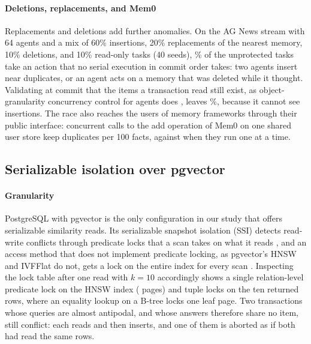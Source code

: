 \documentclass[sigconf, nonacm, review]{acmart}
\begin{document}
\paragraph{Deletions, replacements, and Mem0}
Replacements and deletions add further anomalies. On the AG News stream
with 64 agents and a mix of 60\% insertions, 20\% replacements of the
nearest memory, 10\% deletions, and 10\% read-only tasks (40 seeds),
\% of the unprotected tasks take an action that no
serial execution in commit order takes: two agents insert near
duplicates, or an agent acts on a memory that was deleted while it
thought. Validating at commit that the items a transaction read still
exist, as object-granularity concurrency control for agents does
\cite{DBLP:journals/corr/abs-2606-15376,DBLP:journals/corr/abs-2605-17076},
leaves \%, because it cannot see insertions. The
race also reaches the users of memory frameworks through their public
interface: concurrent calls to the add operation of Mem0
\cite{DBLP:conf/ecai/ChhikaraKASY25} on
one shared user store keep  duplicates per 100 facts,
against  when they run one at a time.

\subsection{Serializable isolation over pgvector}
\label{sec:ssi-cost}

\paragraph{Granularity}
PostgreSQL with pgvector is the only configuration in our study that
offers serializable similarity reads. Its serializable snapshot
isolation (SSI) detects read-write conflicts through predicate locks
that a scan takes on what it reads \cite{DBLP:journals/pvldb/PortsG12},
and an access method that does not implement predicate locking, as
pgvector's HNSW and IVFFlat do not, gets a lock on the entire index for
every scan \cite{readmessi}. Inspecting the lock table after one read
with $k=10$ accordingly shows a single relation-level predicate lock on
the HNSW index ( pages) and tuple
locks on the ten returned rows, where an equality lookup on a B-tree
locks one leaf page. Two transactions whose queries are almost
antipodal, and whose answers therefore share no item, still conflict:
each reads and then inserts, and one of them is aborted as if both
had read the same rows.
\end{document}
